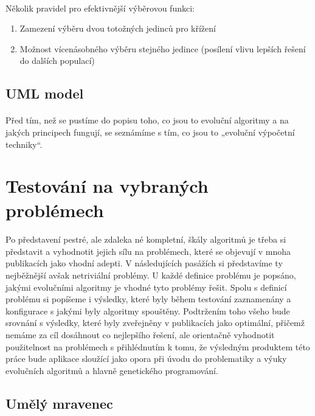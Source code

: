 \documentclass[bc,male,java,dept460]{diploma}		%
\begin{document}
\paragraph*{}
Několik pravidel pro efektivnější výběrovou funkci:
\begin{enumerate}
\item Zamezení výběru dvou totožných jedinců pro křížení
\item Možnost vícenásobného výběru stejného jedince (posílení vlivu lepších řešení do dalších populací)
\end{enumerate}

\subsection{UML model}
\paragraph*{}
Před tím, než se pustíme do popisu toho, co jsou to evoluční algoritmy a na jakých principech fungují, se seznámíme s tím, co jsou to „evoluční výpočetní techniky“.

\section{Testování na vybraných problémech}
\paragraph*{}
Po představení pestré, ale zdaleka né kompletní, škály algoritmů je třeba si představit a vyhodnotit jejich sílu na problémech, které se objevují v mnoha publikacích jako vhodní adepti. V následujících pasážích si představíme ty nejběžnější avšak netriviální problémy. U každé definice problému je popsáno, jakými evolučními algoritmy je vhodné tyto problémy řešit. Spolu s definicí problému si popíšeme i výsledky, které byly během testování zaznamenány a konfigurace s jakými byly algoritmy spouštěny. Podtržením toho všeho bude srovnání s výsledky, které byly zveřejněny v publikacích jako optimální, přičemž nemáme za cíl dosáhnout co nejlepšího řešení, ale orientačně vyhodnotit použitelnost na problémech s přihlédnutím k tomu, že výsledným produktem této práce bude aplikace sloužící jako opora při úvodu do problematiky a výuky evolučních algoritmů a hlavně genetického programování.

\subsection{Umělý mravenec}
\end{document}
